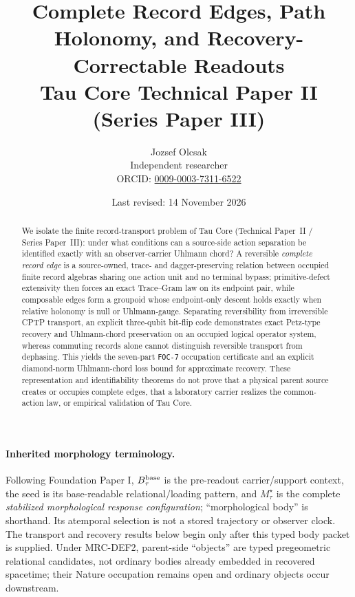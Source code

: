\documentclass[11pt]{article}
\title{\textbf{Complete Record Edges, Path Holonomy, and Recovery-Correctable Readouts}\\
\large Tau Core Technical Paper II (Series Paper III)}
\author{Jozsef Olcsak\\\small Independent researcher\\{\small ORCID: \href{https://orcid.org/0009-0003-7311-6522}{0009-0003-7311-6522}}}
\date{Last revised: 14 November 2026}
\begin{document}
\maketitle

\begin{abstract}
We isolate the finite record-transport problem of Tau Core (Technical Paper~II / Series Paper~III): under what conditions can a source-side action separation be identified exactly with an observer-carrier Uhlmann chord? A reversible \emph{complete record edge} is a source-owned, trace- and dagger-preserving relation between occupied finite record algebras sharing one action unit and no terminal bypass; primitive-defect extensivity then forces an exact Trace--Gram law on its endpoint pair, while composable edges form a groupoid whose endpoint-only descent holds exactly when relative holonomy is null or Uhlmann-gauge. Separating reversibility from irreversible CPTP transport, an explicit three-qubit bit-flip code demonstrates exact Petz-type recovery and Uhlmann-chord preservation on an occupied logical operator system, whereas commuting records alone cannot distinguish reversible transport from dephasing. This yields the seven-part \texttt{FOC-7} occupation certificate and an explicit diamond-norm Uhlmann-chord loss bound for approximate recovery. These representation and identifiability theorems do not prove that a physical parent source creates or occupies complete edges, that a laboratory carrier realizes the common-action law, or empirical validation of Tau Core.
\end{abstract}

\paragraph{Inherited morphology terminology.}
Following Foundation Paper I, $B_\tau^{\rm base}$ is the pre-readout
carrier/support context, the seed is its base-readable relational/loading
pattern, and $M_\tau^\star$ is the complete \emph{stabilized morphological
response configuration}; ``morphological body'' is shorthand.  Its atemporal
selection is not a stored trajectory or observer clock.  The transport and
recovery results below begin only after this typed body packet is supplied.
Under MRC-DEF2, parent-side ``objects'' are typed pregeometric relational
candidates, not ordinary bodies already embedded in recovered spacetime;
their Nature occupation remains open and ordinary objects occur downstream.

\begin{center}
\end{center}
\end{document}
